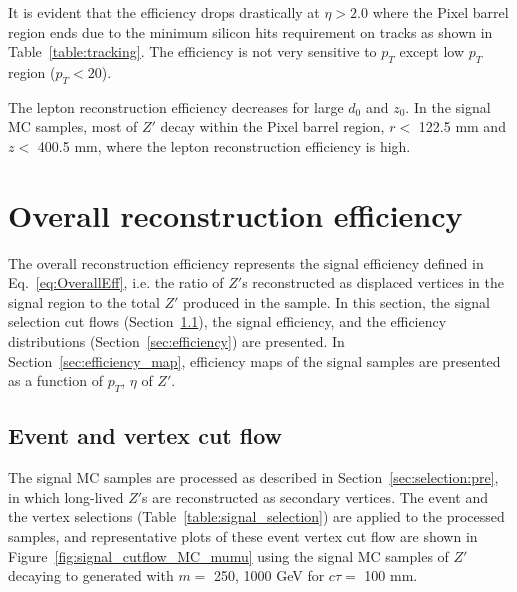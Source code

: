 It is evident that the efficiency drops drastically at $\eta > 2.0$ where the Pixel barrel region ends due to the minimum silicon hits requirement on tracks as shown in Table~\ref{table:tracking}. The efficiency is not very sensitive to $p_{T}$ except low $p_{T}$ region ($p_{T} < 20$).

The lepton reconstruction efficiency decreases for large $d_{0}$ and $z_{0}$. In the signal MC samples, most of $Z'$ decay within the Pixel barrel region, $r < $ 122.5 mm and $z < $ 400.5 mm, where the lepton reconstruction efficiency is high.

\section{Overall reconstruction efficiency}
\label{sec:combined_reco_efficiency}
The overall reconstruction efficiency represents the signal efficiency defined in Eq.~\ref{eq:OverallEff}, i.e. the ratio of $Z'$s reconstructed as displaced vertices in the signal region to the total $Z'$ produced in the sample. In this section, the signal selection cut flows (Section~\ref{sec:signal_cutflow}), the signal efficiency, and the efficiency distributions (Section~\ref{sec:efficiency}) are presented. In Section~\ref{sec:efficiency_map}, efficiency maps of the signal samples are presented as a function of $p_{T}$, $\eta$ of $Z'$.

\subsection{Event and vertex cut flow}
\label{sec:signal_cutflow}
The signal MC samples are processed as described in Section~\ref{sec:selection:pre}, in which long-lived $Z'$s are reconstructed as secondary vertices. The event and the vertex selections (Table~\ref{table:signal_selection}) are applied to the processed samples, and representative plots of these event vertex cut flow are shown in Figure~\ref{fig:signal_cutflow_MC_mumu} using the signal MC samples of $Z'$ decaying to \mumu generated with $m=$ 250, 1000 GeV for $c\tau=$ 100 mm.

